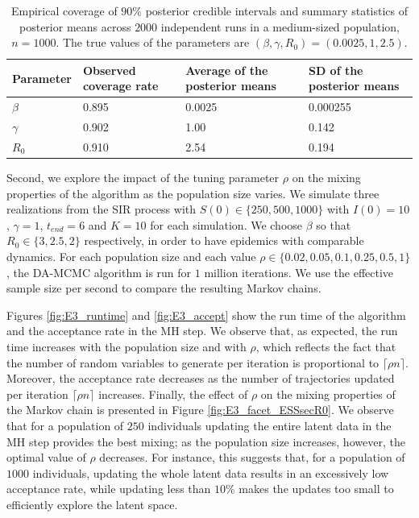 \documentclass[12pt]{article}
\begin{document}
\begin{table}
	\caption{Empirical coverage of $90\%$ posterior credible intervals and summary statistics of posterior means across $2000$ independent runs in a medium-sized population, $n=1000$. The true values of the parameters are $(\beta, \gamma, R_0) = (0.0025, 1, 2.5)$. %
		\label{tab:coverage}}
	\begin{center}
		\begin{tabular}{ C{2cm}| *{3}{C{3cm}}}
			Parameter & Observed coverage rate & Average of the posterior means & SD of the posterior means \\ 
			\hline
			$\beta$ & 0.895 & 0.0025 & 0.000255 \\ 
			$\gamma$ & 0.902 & 1.00 & 0.142 \\ 
			$R_0$ & 0.910 & 2.54 & 0.194 \\
			\hline
		\end{tabular}
	\end{center}
\end{table}

Second, we explore the impact of the tuning parameter $\rho$ on the mixing properties of the algorithm as the population size varies.
We simulate three realizations from the SIR process with $S(0) \in \{250, 500, 1000\}$ with  $I(0)=10$, $\gamma=1$, $t_{end} = 6$ and $K = 10$ for each simulation. We choose $\beta$ so that $R_0 \in \{3, 2.5, 2\}$ respectively, in order to have epidemics with comparable dynamics. For each population size and each value $\rho \in \{0.02, 0.05, 0.1, 0.25, 0.5, 1\}$, the DA-MCMC algorithm is run for $1$ million iterations. We use the effective sample size per second to compare the resulting Markov chains.

Figures \ref{fig:E3_runtime} and \ref{fig:E3_accept} show the run time of the algorithm and the acceptance rate in the MH step. We observe that, as expected, the run time increases with the population size and with $\rho$, which reflects the fact that the number of random variables to generate per iteration is proportional to $\lceil\rho n\rceil$. Moreover, the acceptance rate decreases as the number of trajectories updated per iteration $\lceil\rho n\rceil$ increases.
Finally, the effect of $\rho$ on the mixing properties of the Markov chain is presented in Figure \ref{fig:E3_facet_ESSsecR0}. We observe that for a population of $250$ individuals updating the entire latent data in the MH step provides the best mixing; as the population size increases, however, the optimal value of $\rho$ decreases. For instance, this suggests that, for a population of $1000$ individuals, updating the whole latent data results in an excessively low acceptance rate, while updating less than $10$\% makes the updates too small to efficiently explore the latent space.
\end{document}
